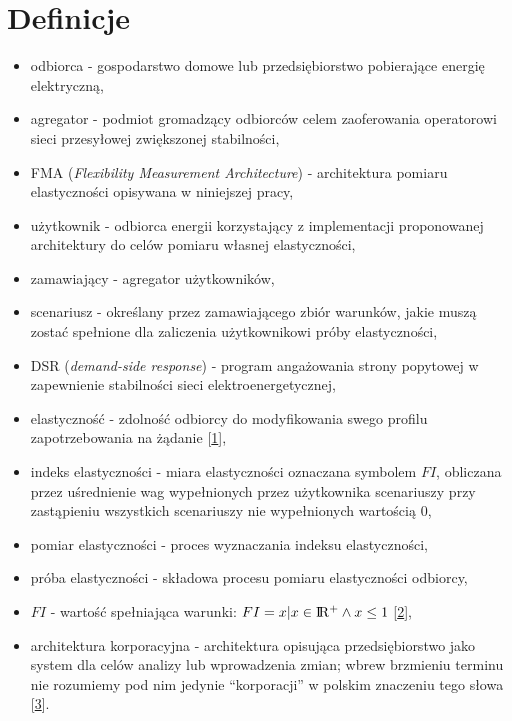 \hypertarget{definicje}{%
\chapter*{Definicje}\label{definicje}}

\begin{itemize}
\tightlist
\item
  odbiorca - gospodarstwo domowe lub przedsiębiorstwo pobierające
  energię elektryczną,
\item
  agregator - podmiot gromadzący odbiorców celem zaoferowania
  operatorowi sieci przesyłowej zwiększonej stabilności,
\item
  FMA (\emph{Flexibility Measurement Architecture}) - architektura
  pomiaru elastyczności opisywana w niniejszej pracy,
\item
  użytkownik - odbiorca energii korzystający z implementacji
  proponowanej architektury do celów pomiaru własnej elastyczności,
\item
  zamawiający - agregator użytkowników,
\item
  scenariusz - określany przez zamawiającego zbiór warunków, jakie muszą
  zostać spełnione dla zaliczenia użytkownikowi próby elastyczności,
\item
  DSR (\emph{demand-side response}) - program angażowania strony
  popytowej w zapewnienie stabilności sieci elektroenergetycznej,
\item
  elastyczność - zdolność odbiorcy do modyfikowania swego profilu
  zapotrzebowania na żądanie
  {[}\protect\hyperlink{ref-finck_quantifying_2018}{1}{]},
\item
  indeks elastyczności - miara elastyczności oznaczana symbolem \(FI\),
  obliczana przez uśrednienie wag wypełnionych przez użytkownika
  scenariuszy przy zastąpieniu wszystkich scenariuszy nie wypełnionych
  wartością \(0\),
\item
  pomiar elastyczności - proces wyznaczania indeksu elastyczności,
\item
  próba elastyczności - składowa procesu pomiaru elastyczności odbiorcy,
\item
  \(FI\) - wartość spełniająca warunki:
  \(FI = x \vert x \in {\rm I\!R^+} \land x \le 1\)
  {[}\protect\hyperlink{ref-junker_characterizing_2018}{2}{]},
\item
  architektura korporacyjna - architektura opisująca przedsiębiorstwo
  jako system dla celów analizy lub wprowadzenia zmian; wbrew brzmieniu
  terminu nie rozumiemy pod nim jedynie ``korporacji'' w polskim
  znaczeniu tego słowa {[}\protect\hyperlink{ref-leks_pare_2010}{3}{]}.
\end{itemize}

